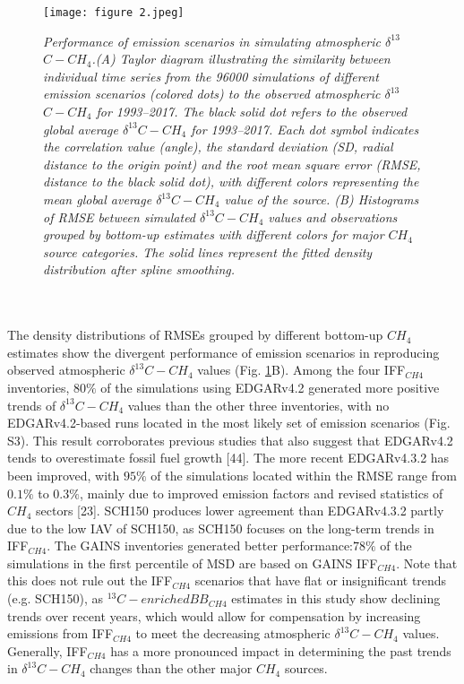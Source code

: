\documentclass[a4paper,12pt]{article}
\begin{document}
\begin{figure}[H]
    \caption{}
    \texttt{[image: figure 2.jpeg]}
    \label{fig2:my_label}



\textit{\scriptsize{Performance of emission scenarios in simulating atmospheric $\delta^{13}$$C-CH_{4}$.(A) Taylor diagram illustrating the similarity between individual time series from the 96000 simulations of different emission scenarios (colored dots) to the observed atmospheric $\delta^{13}$$C-CH_{4}$ for 1993–2017. The black solid dot refers to the observed global average $\delta^{13}$$C-CH_{4}$ for 1993–2017. Each dot symbol indicates the correlation value (angle), the standard deviation (SD, radial distance to the origin point) and the root mean square error (RMSE, distance to the black solid dot), with different colors representing the mean global average $\delta^{13}$$C-CH_{4}$ value of the source. (B) Histograms of RMSE between simulated $\delta^{13}$$C-CH_{4}$ values and observations grouped by bottom-up estimates with different colors for major $CH_{4}$ source categories. The solid lines represent the fitted density distribution after spline smoothing.}}
\end{figure}
\\\\
\small{The density distributions of RMSEs grouped by different bottom-up $CH_{4}$ estimates show the divergent performance of emission scenarios in reproducing observed atmospheric $\delta^{13}$$C-CH_{4}$ values (Fig. \ref{fig2:my_label}B). Among the four IFF$_{CH4}$ inventories, $80\%$ of the simulations using EDGARv4.2 generated more positive trends of $\delta^{13}$$C-CH_{4}$ values than the other three inventories, with no EDGARv4.2-based runs located in the most likely set of emission scenarios (Fig. S3). This result corroborates previous studies that also suggest that EDGARv4.2 tends to overestimate fossil fuel growth [44]. The more recent EDGARv4.3.2 has been improved, with $95\%$ of the simulations located within the RMSE range from $0.1\%$ to $0.3\%$, mainly due to improved emission factors and revised statistics of $CH_{4}$ sectors [23]. SCH150 produces lower agreement than EDGARv4.3.2 partly due to the low IAV of SCH150, as SCH150 focuses on the long-term trends in IFF$_{CH4}$. The GAINS inventories generated better performance:$78\%$ of the simulations in the first percentile of MSD are based on GAINS IFF$_{CH4}$. Note that this does not rule out the IFF$_{CH4}$ scenarios that have flat or insignificant trends (e.g. SCH150), as $^{13}C-enriched BB_{CH4}$ estimates in this study show declining trends over recent years, which would allow for compensation by increasing emissions from IFF$_{CH4}$ to meet the decreasing atmospheric $\delta^{13}$$C-CH_{4}$ values. Generally, IFF$_{CH4}$ has a more pronounced impact in determining the past trends in $\delta^{13}$$C-CH_{4}$ changes than the other major $CH_{4}$ sources.}
\end{document}

